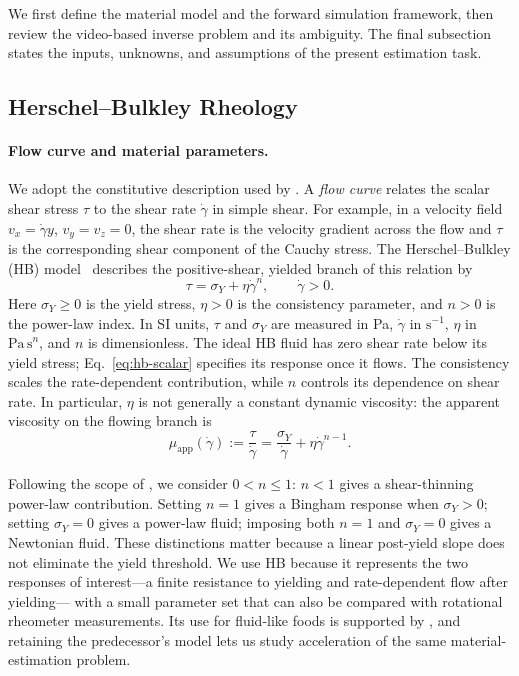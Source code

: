 We first define the material model and the forward simulation framework,
then review the video-based inverse problem and its ambiguity. The final
subsection states the inputs, unknowns, and assumptions of the present
estimation task.

\subsection{Herschel--Bulkley Rheology}
\label{sec:hb-rheology}

\paragraph{Flow curve and material parameters.}
We adopt the constitutive description used by
\citet{hamamichi2023nonnewtonian}. A \emph{flow curve} relates the
scalar shear stress $\tau$ to the shear rate $\dot\gamma$ in simple
shear. For example, in a velocity field $v_x=\dot\gamma y$,
$v_y=v_z=0$, the shear rate is the velocity gradient across the flow
and $\tau$ is the corresponding shear component of the Cauchy stress.
The Herschel--Bulkley (HB) model~\cite{herschel1926konsistenzmessungen}
describes the positive-shear, yielded branch of this relation by
\begin{equation}
\label{eq:hb-scalar}
    \tau=\sigma_Y+\eta\dot\gamma^n,
    \qquad \dot\gamma>0.
\end{equation}
Here $\sigma_Y\geq0$ is the yield stress, $\eta>0$ is the
consistency parameter, and $n>0$ is the power-law index. In SI units,
$\tau$ and $\sigma_Y$ are measured in Pa, $\dot\gamma$ in
$\mathrm{s}^{-1}$, $\eta$ in $\mathrm{Pa\,s}^{n}$, and $n$ is
dimensionless. The ideal HB fluid has zero shear rate below its yield
stress; Eq.~\eqref{eq:hb-scalar} specifies its response once it flows.
The consistency scales the rate-dependent contribution, while $n$
controls its dependence on shear rate. In particular, $\eta$ is not
generally a constant dynamic viscosity: the apparent viscosity on the
flowing branch is
\begin{equation}
\label{eq:hb-apparent-viscosity}
    \mu_{\mathrm{app}}(\dot\gamma)
    :=\frac{\tau}{\dot\gamma}
    =\frac{\sigma_Y}{\dot\gamma}+\eta\dot\gamma^{n-1}.
\end{equation}

Following the scope of \citet{hamamichi2023nonnewtonian}, we consider
$0<n\leq1$: $n<1$ gives a shear-thinning power-law contribution.
Setting $n=1$ gives a Bingham response when $\sigma_Y>0$; setting
$\sigma_Y=0$ gives a power-law fluid; imposing both $n=1$ and
$\sigma_Y=0$ gives a Newtonian fluid. These distinctions matter because
a linear post-yield slope does not eliminate the yield threshold.
We use HB because it represents the two responses of interest---a
finite resistance to yielding and rate-dependent flow after yielding---
with a small parameter set that can also be compared with rotational
rheometer measurements. Its use for fluid-like foods is supported by
\citet{nagasawa2019mixing}, and retaining the predecessor's model
lets us study acceleration of the same material-estimation problem.

